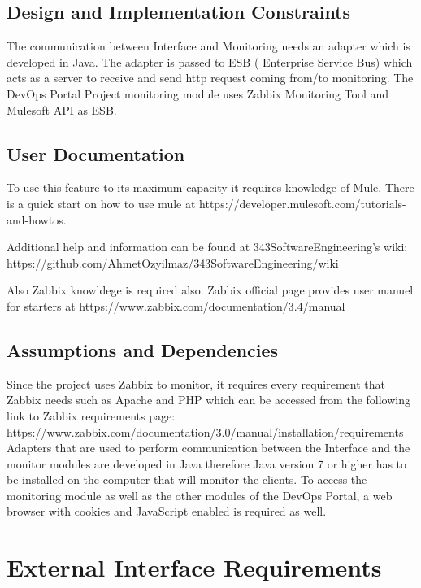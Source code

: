 \documentclass{article}
\begin{document}
\subsection{Design and Implementation Constraints}

  The communication between Interface and Monitoring needs an adapter which is developed in Java. The adapter is passed to ESB ( Enterprise Service Bus) which acts as a server to receive and send http request coming from/to monitoring. The DevOps Portal Project monitoring module uses Zabbix Monitoring Tool and Mulesoft API as ESB.


\subsection{User Documentation}

To use this feature to its maximum capacity it requires knowledge of Mule. There is a quick start on how to use mule at 
\newline https://developer.mulesoft.com/tutorials-and-howtos. 

Additional help and information can be found at 343SoftwareEngineering’s wiki:
\newline https://github.com/AhmetOzyilmaz/343SoftwareEngineering/wiki
 
Also Zabbix knowldege is required also. Zabbix official page provides user manuel for starters at https://www.zabbix.com/documentation/3.4/manual

\subsection{Assumptions and Dependencies}
Since the project uses Zabbix to monitor, it requires every requirement that Zabbix needs such as Apache and PHP which can be accessed from the following link to Zabbix requirements page:
https://www.zabbix.com/documentation/3.0/manual/installation/requirements
Adapters that are used to perform communication between the Interface and the monitor modules are developed in Java therefore Java version 7 or higher has to be installed on the computer that will monitor the clients. 
To access the monitoring module as well as the other modules of the DevOps Portal, a web browser with cookies and JavaScript enabled is required as well.

\section{External Interface Requirements}
\end{document}
